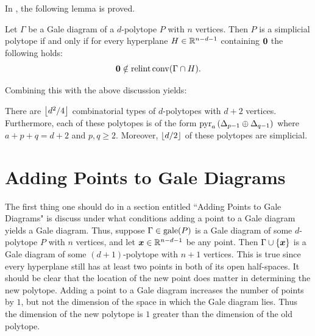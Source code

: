     In \cite{McMullenBook}, the following lemma is proved.
    \begin{Lemma}
        Let \(\Gamma\) be a Gale diagram of a \(d\)-polytope \(P\) with \(n\) vertices.  Then \(P\) is a simplicial polytope if and only if for every hyperplane \(H\in\mathbb{R}^{n-d-1}\) containing \(\bm{0}\) the following holds:
            \[
                \bm{0}
                    \notin \operatorname{relint}\operatorname{conv}(\Gamma\cap H).
            \]
    \end{Lemma}

    Combining this with the above discussion yields:
    \begin{Theorem}
        There are \(\left\lfloor{d^2}/4\right\rfloor\) combinatorial types of \(d\)-polytopes with \(d+2\) vertices.  Furthermore, each of these polytopes is of the form \(\operatorname{pyr}_a\left(\Delta_{p-1}\oplus\Delta_{q-1}\right)\) where \(a+p+q=d+2\) and \(p,q\ge2\).  Moreover, \(\left\lfloor d/2\right\rfloor\) of these polytopes are simplicial.
    \end{Theorem}

\section{Adding Points to Gale Diagrams}
    The first thing one should do in a section entitled ``Adding Points to Gale Diagrams" is discuss under what conditions adding a point to a Gale diagram yields a Gale diagram.  Thus, suppose \(\Gamma\in\operatorname{gale}(P)\) is a Gale diagram of some \(d\)-polytope \(P\) with \(n\) vertices, and let \(\bm{x}\in\mathbb{R}^{n-d-1}\) be any point.  Then \(\Gamma\cup\left\{\bm{x}\right\}\) is a Gale diagram of some \((d+1)\)-polytope with \(n+1\) vertices.  This is true since every hyperplane still has at least two points in both of its open half-spaces.  It should be clear that the location of the new point does matter in determining the new polytope.  Adding a point to a Gale diagram increases the number of points by \(1\), but not the dimension of the space in which the Gale diagram lies. Thus the dimension of the new polytope is \(1\) greater than the dimension of the old polytope.

